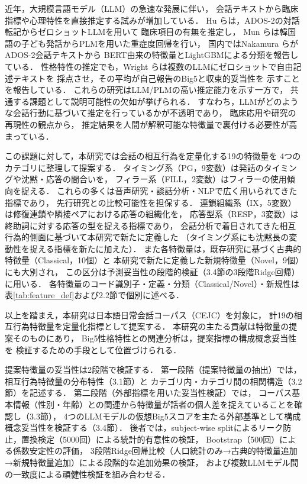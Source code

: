 \documentclass[dvipdfmx,11pt,a4paper]{bxjsarticle}
\renewcommand{\_}{\paperorigunderscore\allowbreak}%
\begin{document}
近年，大規模言語モデル（LLM）の急速な発展に伴い，
会話テキストから臨床指標や心理特性を直接推定する試みが増加している．
Hu ら\cite{hu2025}は，ADOS-2の対話転記からゼロショットLLMを用いて
臨床項目の有無を推定し，
Mun ら\cite{mun2024}は韓国語の子ども発話からPLMを用いた重症度回帰を行い，
国内ではNakamura ら\cite{nakamura2025}がADOS-2会話テキストから
BERT由来の特徴量とLightGBMによる分類を報告している．
性格特性の推定でも，Wright ら\cite{wright2026}は複数のLLMにゼロショットで自由記述テキストを
採点させ，その平均が自己報告のBig5と収束的妥当性を
示すことを報告している．
これらの研究はLLM/PLMの高い推定能力を示す一方で，
共通する課題として説明可能性の欠如が挙げられる．
すなわち，LLMがどのような会話行動に基づいて推定を行っているかが不透明であり，
臨床応用や研究の再現性の観点から，
推定結果を人間が解釈可能な特徴量で裏付ける必要性が高まっている．

この課題に対して，本研究では会話の相互行為を定量化する19の特徴量を
4つのカテゴリに整理して提案する．
タイミング系（PG，9変数）は発話のタイミングや沈黙・応答の間合いを，
フィラー系（FILL，2変数）はフィラーの使用傾向を捉える．
これらの多くは音声研究・談話分析・NLPで広く用いられてきた指標であり\cite{levitan2012,deruiter2006,clark1996,watanabe2003}，
先行研究との比較可能性を担保する．
連鎖組織系（IX，5変数）は修復連鎖や隣接ペアにおける応答の組織化を，
応答型系（RESP，3変数）は終助詞に対する応答の型を捉える指標であり，
会話分析で着目されてきた相互行為的側面に基づいて本研究で新たに定義した
（タイミング系にも沈黙長の変動性を捉える指標を新たに加えた）．
また各特徴量は，既存研究に基づく古典的特徴量（Classical，10個）と
本研究で新たに定義した新規特徴量（Novel，9個）にも大別され，
この区分は予測妥当性の段階的検証（3.4節の3段階Ridge回帰）に用いる．
各特徴量のコード識別子・定義・分類（Classical/Novel）・新規性は
表\ref{tab:feature_def}および2.2節で個別に述べる．

以上を踏まえ，本研究は日本語日常会話コーパス（CEJC）を対象に，
計19の相互行為特徴量を定量化指標として提案する．
本研究の主たる貢献は特徴量の提案そのものにあり，
Big5性格特性との関連分析は，提案指標の構成概念妥当性を
検証するための手段として位置づけられる．

提案特徴量の妥当性は2段階で検証する．
第一段階（提案特徴量の抽出）では，相互行為特徴量の分布特性（3.1節）と
カテゴリ内・カテゴリ間の相関構造（3.2節）を記述する．
第二段階（外部指標を用いた妥当性検証）では，
コーパス基本情報（性別・年齢）との関連から特徴量が話者の個人差を捉えていることを確認し（3.3節），
4つのLLMモデルの仮想Big5スコアを主たる外部基準として構成概念妥当性を検証する（3.4節）．
後者では，subject-wise splitによるリーク防止，置換検定（5000回）による統計的有意性の検証，
Bootstrap（500回）による係数安定性の評価，
3段階Ridge回帰比較（人口統計のみ→古典的特徴量追加→新規特徴量追加）による段階的な追加効果の検証，
および複数LLMモデル間の一致度による頑健性検証を組み合わせる．
\end{document}
